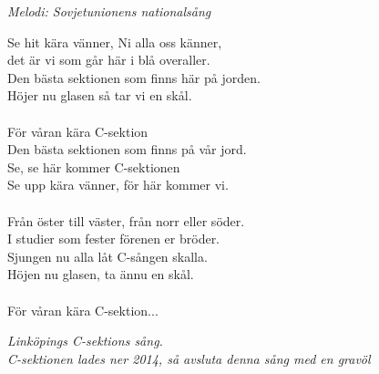 {\footnotesize\textit{Melodi: Sovjetunionens nationalsång}}\par
\vspace{10pt}
Se hit kära vänner, Ni alla oss känner,\\
det är vi som går här i blå overaller.\\
Den bästa sektionen som finns här på jorden.\\
Höjer nu glasen så tar vi en skål.\\
\\
\revrpt För våran kära C-sektion \rpt\\
Den bästa sektionen som finns på vår jord.\\
\revrpt Se, se här kommer C-sektionen \rpt\\
Se upp kära vänner, för här kommer vi.\\
\\
Från öster till väster, från norr eller söder.\\
I studier som fester förenen er bröder.\\
Sjungen nu alla låt C-sången skalla.\\
Höjen nu glasen, ta ännu en skål.\\
\\
För våran kära C-sektion...
\par
\vspace{10pt}
{\footnotesize\textit{Linköpings C-sektions sång. \\
					 C-sektionen lades ner 2014, så avsluta denna sång med en gravöl}}

